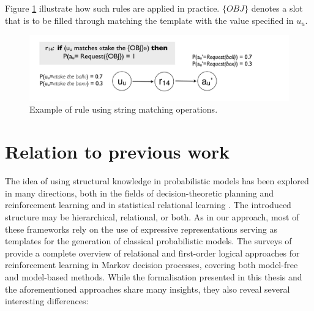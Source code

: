 Figure \ref{fig:stringmanip} illustrate how such rules are applied in practice.  $\{OBJ\}$ denotes a slot that is to be filled through matching the template with the value specified in $u_u$. 
\begin{figure}[h]
\centering
\includegraphics[scale=0.25]{imgs/stringmanip.pdf}
\caption{Example of rule using string matching operations.}
\label{fig:stringmanip}
\end{figure}

\section{Relation to previous work}
\label{sec:relatedwork}

The idea of using structural knowledge in probabilistic models has been explored in many directions, both in the fields of decision-theoretic planning and reinforcement learning \citep{Hauskrecht98,Pineau2004,KerstingR04,lang10jair,Otterlo2012} and in statistical relational learning \citep{Jaeger01,Richardson:2006,getoor:srlbook07}.  The introduced structure may be hierarchical, relational, or both. As in our approach, most of these frameworks rely on the use of expressive representations serving as templates for the generation of classical probabilistic models.  The surveys of \cite{Otterlo2006,Otterlo2012} provide a complete overview of relational and first-order logical approaches for reinforcement learning in Markov decision processes, covering both model-free and model-based methods.  While the formalisation presented in this thesis and the aforementioned approaches share many insights, they also reveal several interesting differences: 

